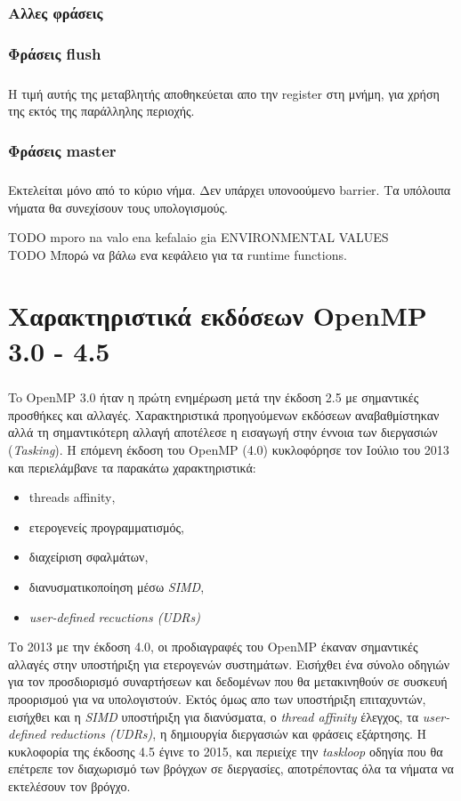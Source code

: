 \documentclass[12pt]{article}
\newcommand{\en}[1]{\foreignlanguage{english}{#1}}
\begin{document}
\subsubsection{Αλλες φράσεις}
\subparagraph{}
\subsubsection{Φράσεις \en{flush}}
\subparagraph{}
Η τιμή αυτής της μεταβλητής αποθηκεύεται απο την register στη μνήμη, για χρήση της εκτός της παράλληλης περιοχής.
\subsubsection{Φράσεις \en{master}}
\subparagraph{}
      Εκτελείται μόνο από το κύριο νήμα. Δεν υπάρχει υπονοούμενο barrier. Τα υπόλοιπα νήματα θα συνεχίσουν τους υπολογισμούς.

{\Large TODO mporo na valo ena kefalaio gia ENVIRONMENTAL VALUES \\
TODO  Μπορώ να βάλω ενα κεφάλειο για τα runtime functions.}

\clearpage
\section{Χαρακτηριστικά εκδόσεων \en{OpenMP} 3.0 - 4.5}
\subparagraph{}
To \en{OpenMP} 3.0 ήταν η πρώτη ενημέρωση μετά την έκδοση 2.5 με σημαντικές προσθήκες και αλλαγές. Χαρακτηριστικά προηγούμενων εκδόσεων αναβαθμίστηκαν αλλά τη σημαντικότερη αλλαγή αποτέλεσε η εισαγωγή στην έννοια των διεργασιών (\emph{\en{Tasking}}). Η επόμενη έκδοση του \en{OpenMP} (4.0) κυκλοφόρησε τον Ιούλιο του 2013 και περιελάμβανε τα παρακάτω χαρακτηριστικά:
\begin{itemize}
    \item \en{threads affinity},
    \item ετερογενείς προγραμματισμός,
    \item διαχείριση σφαλμάτων,
    \item διανυσματικοποίηση μέσω \emph{\en{SIMD}},
    \item \emph{\en{user-defined recuctions (UDRs)}}

\end{itemize}


Το 2013 με την έκδοση 4.0, οι προδιαγραφές του OpenMP έκαναν σημαντικές αλλαγές στην υποστήριξη για ετερογενών συστημάτων. Εισήχθει ένα σύνολο οδηγιών για τον προσδιορισμό συναρτήσεων και δεδομένων που θα μετακινηθούν σε συσκευή προορισμού για να υπολογιστούν. Εκτός όμως απο των υποστήριξη επιταχυντών, εισήχθει και η \emph{\en{SIMD}} υποστήριξη για διανύσματα, ο \emph{\en{thread affinity}} έλεγχος, τα \emph{\en{user-defined reductions (UDRs)}}, η δημιουργία διεργασιών και φράσεις εξάρτησης. 
Η κυκλοφορία της έκδοσης 4.5 έγινε το 2015, και περιείχε την \emph{\en{taskloop}} οδηγία που θα επέτρεπε τον διαχωρισμό των βρόγχων σε διεργασίες, αποτρέποντας όλα τα νήματα να εκτελέσουν τον βρόγχο.
\end{document}
